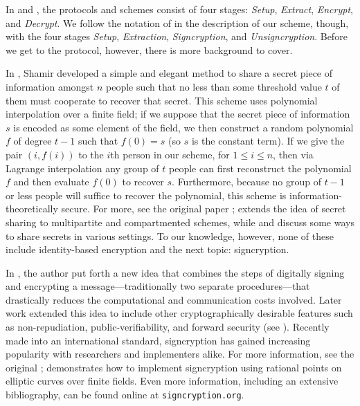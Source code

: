 In \cite{shamir1985identity} and \cite{boneh2001identity}, the protocols and
    schemes consist of four stages: \textit{Setup}, \textit{Extract},
    \textit{Encrypt}, and \textit{Decrypt}.
We follow the notation of \cite{li2006id} in the description of our scheme,
    though, with the four stages \textit{Setup}, \textit{Extraction},
    \textit{Signcryption}, and \textit{Unsigncryption}.
Before we get to the protocol, however, there is more background to cover.


In \cite{shamir1979share}, Shamir developed a simple and elegant method to
    share a secret piece of information amongst $n$ people such that no less
    than some threshold value $t$ of them must cooperate to recover that
    secret.
This scheme uses polynomial interpolation over a finite field; if we suppose
    that the secret piece of information $s$ is encoded as some element of the
    field, we then construct a random polynomial $f$ of degree $t - 1$ such
    that $f(0) = s$ (so $s$ is the constant term).
If we give the pair $(i, f(i))$ to the $i$th person in our scheme, for $1 \le i
    \le n$, then via Lagrange interpolation any group of $t$ people can first
    reconstruct the polynomial $f$ and then evaluate $f(0)$ to recover $s$.
Furthermore, because no group of $t - 1$ or less people will suffice to recover
    the polynomial, this scheme is information-theoretically secure.
For more, see the original paper \cite{shamir1979share};
    \cite{simmons1990really} extends the idea of secret sharing to multipartite
    and compartmented schemes, while \cite{brickell1990some, ghodosi1998secret,
    iftene2005compartmented} and \cite{iftene2007general} discuss some ways to
    share secrets in various settings.
To our knowledge, however, none of these include identity-based encryption and
    the next topic: signcryption.


In \cite{zheng1997digital}, the author put forth a new idea that combines the
    steps of digitally signing and encrypting a message---traditionally two
    separate procedures---that drastically reduces the computational and
    communication costs involved.
Later work extended this idea to include other cryptographically desirable
    features such as non-repudiation, public-verifiability, and forward
    security (see \cite{li2006id}).
Recently made into an international standard, signcryption has gained
    increasing popularity with researchers and implementers alike.
For more information, see the original \cite{zheng1997digital};
    \cite{zheng1998construct} demonstrates how to implement signcryption using
    rational points on elliptic curves over finite fields.
Even more information, including an extensive bibliography, can be found online
    at \texttt{signcryption.org}.

